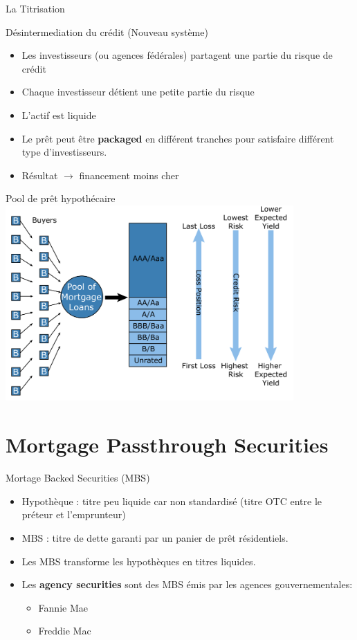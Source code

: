 \documentclass[10pt,a4paper]{beamer}
\begin{document}
\begin{frame}{La Titrisation}
\begin{block}{Désintermediation du crédit (Nouveau système)}
\begin{itemize}[label=\bullet]
\item Les investisseurs (ou agences fédérales) partagent une partie du risque de crédit
\item Chaque investisseur détient une petite partie du risque
\item L’actif est liquide
\item Le prêt peut être \textbf{packaged} en différent tranches pour satisfaire différent type d’investisseurs.
\item Résultat $\rightarrow$ financement moins cher
\end{itemize}
\end{block}
\end{frame}

\begin{frame}{Pool de prêt hypothécaire}
\includegraphics[width=110mm]{Pool}
\end{frame}

\section{Mortgage Passthrough Securities}

\begin{frame}{Mortage Backed Securities (MBS)}
\begin{itemize}[label=\bullet]
\item Hypothèque : titre peu liquide car non standardisé (titre OTC entre le préteur et l’emprunteur)
\item MBS : titre de dette garanti par un panier de prêt résidentiels. 
\item Les MBS transforme les hypothèques en titres liquides.
\item Les \textbf{agency securities} sont des MBS émis par les agences gouvernementales:
\begin{itemize}[label=\bullet]
\item Fannie Mae
\item Freddie Mac
\end{itemize}
\end{itemize}
\end{frame}
\end{document}
